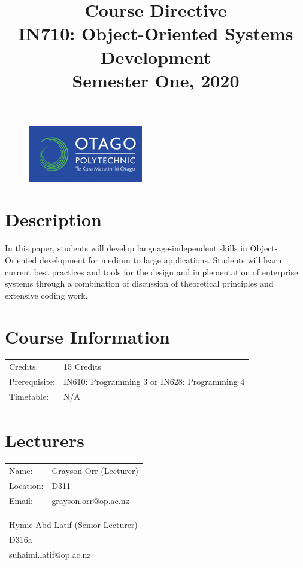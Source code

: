 \documentclass{article}
\author{}
\begin{document}
\begin{figure}
	\includegraphics[width=50mm]{../resources/img/logo.png}
\end{figure}

\title{Course Directive\\IN710: Object-Oriented Systems Development\\Semester One, 2020}
\date{}
\maketitle

\section*{Description}
In this paper, students will develop language-independent skills in Object-Oriented development for medium to large applications. Students will learn current best practices and tools for the design and implementation of enterprise systems through a combination of discussion of theoretical principles and extensive coding work.

\section*{Course Information}
\begin{tabular}{ll}
	Credits:      & 15 Credits                                   \\
	Prerequisite: & IN610: Programming 3 or IN628: Programming 4 \\
	Timetable:    & N/A                                          \\
\end{tabular}

\section*{Lecturers}
\begin{tabular}{ll}
	Name:     & Grayson Orr (Lecturer) \\
	Location: & D311                   \\
	Email:    & grayson.orr@op.ac.nz   \\
\end{tabular}
\begin{tabular}{l}
	Hymie Abd-Latif (Senior Lecturer) \\
	D316a                             \\
	suhaimi.latif@op.ac.nz            \\
\end{tabular}
\end{document}
